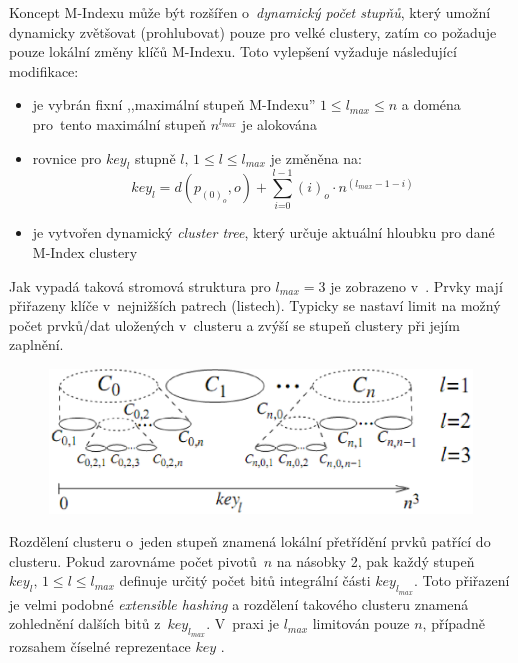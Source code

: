 Koncept M-Indexu může být rozšířen o~\emph{dynamický počet stupňů},
který umožní  dynamicky zvětšovat (prohlubovat)
pouze pro velké clustery, zatím co 
požaduje pouze lokální změny klíčů M-Indexu. Toto vylepšení vyžaduje
následující modifikace:
\begin{itemize}
\item je vybrán fixní ,,maximální stupeň M-Indexu'' $1\leq l_{max}\leq n$
a doména pro~tento maximální stupeň $n^{l_{max}}$ je alokována
\item rovnice  pro $key_{l}$ stupně $l,\,1\leq l\leq l_{max}$
je změněna na:
\begin{equation}
key_{l}=d(p_{(0)_{o}},o)+\sum_{i\text{=0}}^{l-1}(i)_{o}\cdot n{}^{(l_{max}-1-i)}\label{eq:M-Index-key-max-level}
\end{equation}

\item je vytvořen dynamický \emph{cluster tree}, který určuje aktuální hloubku
pro dané M-Index clustery
\end{itemize}
Jak vypadá taková stromová struktura pro $l_{max}=3$ je zobrazeno
v~\@. Prvky mají přiřazeny
klíče v~nejnižších patrech (listech). Typicky se nastaví limit na
možný počet prvků/dat uložených v~clusteru a zvýší se stupeň clustery
při jejím zaplnění.

\begin{figure}[t]


\centering{}\includegraphics[scale=0.5]{m-index-dynamic-cluster}\caption{\label{fig:Dynamic-Cluster-Tree}}
\end{figure}


Rozdělení clusteru o~jeden stupeň znamená lokální přetřídění prvků
patřící do clusteru\@. Pokud zarovnáme počet pivotů~$n$ na násobky
2, pak každý stupeň $key_{l},\,1\leq l\leq l_{max}$ definuje určitý
počet bitů integrální části $key_{l_{max}}$\@. Toto přiřazení je
velmi podobné \emph{extensible hashing}\cite{Fagin:1979:EHF:320083.320092}
a rozdělení takového clusteru znamená zohlednění dalších bitů z~$key_{l_{max}}$\@.
V~praxi je $l_{max}$ limitován pouze $n$, případně rozsahem číselné
reprezentace $key$ \@.



